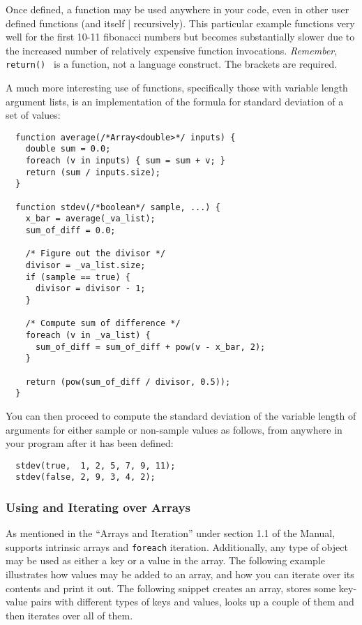 Once defined, a function may be used anywhere in your code, even in other user 
defined functions (and itself | recursively). This particular example functions
very well for the first 10-11 fibonacci numbers but becomes substantially slower
due to the increased number of relatively expensive function invocations.
\emph{Remember}, {\tt return() } is a function, not a language construct.
The brackets are required.

A much more interesting use of functions, specifically those with variable
length argument lists, is an implementation of the formula for standard deviation
of a set of values:

\lstset{language=LQX}
\begin{lstlisting}
  function average(/*Array<double>*/ inputs) {
    double sum = 0.0;
    foreach (v in inputs) { sum = sum + v; }
    return (sum / inputs.size);
  }
  
  function stdev(/*boolean*/ sample, ...) {
    x_bar = average(_va_list);
    sum_of_diff = 0.0;
    
    /* Figure out the divisor */
    divisor = _va_list.size;
    if (sample == true) {
      divisor = divisor - 1;
    }
    
    /* Compute sum of difference */
    foreach (v in _va_list) { 
      sum_of_diff = sum_of_diff + pow(v - x_bar, 2); 
    }
    
    return (pow(sum_of_diff / divisor, 0.5));
  }
\end{lstlisting}

You can then proceed to compute the standard deviation of the variable length of
arguments for either sample or non-sample values as follows, from anywhere in your
program after it has been defined:

\lstset{language=LQX}
\begin{lstlisting}
  stdev(true,  1, 2, 5, 7, 9, 11);
  stdev(false, 2, 9, 3, 4, 2);
\end{lstlisting}

\subsubsection{Using and Iterating over Arrays}

As mentioned in the ``Arrays and Iteration'' under section 1.1 of the Manual, 
\ModLang supports intrinsic arrays and {\tt foreach} iteration. Additionally, any
type of object may be used as either a key or a value in the array. The following
example illustrates how values may be added to an array, and how you can 
iterate over its contents and print it out. The following snippet creates an array,
stores some key-value pairs with different types of keys and values, looks up a
couple of them and then iterates over all of them.

